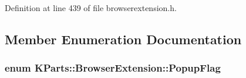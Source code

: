 Definition at line 439 of file browserextension.\+h.



\subsection{Member Enumeration Documentation}
\hypertarget{classKParts_1_1BrowserExtension_ae5b9acf92e7d83faf5142597371ef1e3}{
\subsubsection[{Popup\+Flag}]{\setlength{\rightskip}{0pt plus 5cm}enum {\bf K\+Parts\+::\+Browser\+Extension\+::\+Popup\+Flag}}}\label{classKParts_1_1BrowserExtension_ae5b9acf92e7d83faf5142597371ef1e3}
